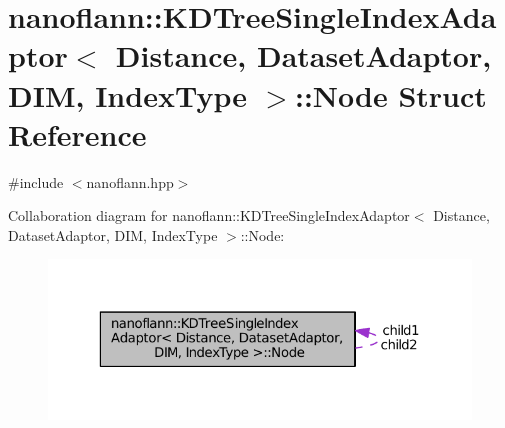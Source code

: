 \hypertarget{structnanoflann_1_1_k_d_tree_single_index_adaptor_1_1_node}{\section{nanoflann\-:\-:K\-D\-Tree\-Single\-Index\-Adaptor$<$ Distance, Dataset\-Adaptor, D\-I\-M, Index\-Type $>$\-:\-:Node Struct Reference}
\label{structnanoflann_1_1_k_d_tree_single_index_adaptor_1_1_node}
}


{\ttfamily \#include $<$nanoflann.\-hpp$>$}



Collaboration diagram for nanoflann\-:\-:K\-D\-Tree\-Single\-Index\-Adaptor$<$ Distance, Dataset\-Adaptor, D\-I\-M, Index\-Type $>$\-:\-:Node\-:
\nopagebreak
\begin{figure}[H]
\begin{center}
\leavevmode
\includegraphics[width=323pt]{structnanoflann_1_1_k_d_tree_single_index_adaptor_1_1_node__coll__graph}
\end{center}
\end{figure}
